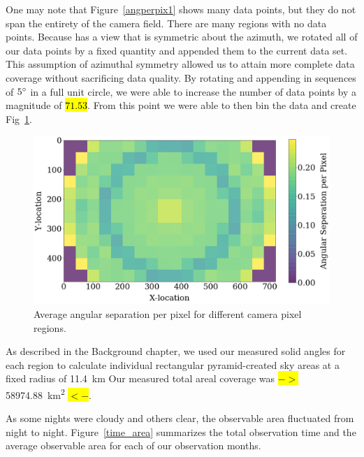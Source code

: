 One may note that Figure~\ref{angperpix1} shows many data points, but they do not span the entirety of the camera field. 
There are many regions with no data points.
Because has a view that is symmetric about the azimuth, we rotated all of our data points by a fixed quantity and appended them to the current data set.  
This assumption of azimuthal symmetry allowed us to attain more complete data coverage without sacrificing data quality.
By rotating and appending in sequences of $5\degree$ in a full unit circle, we were able to increase the number of data points by a magnitude of \hl{$71.53$}.
From this point we were able to then bin the data and create Fig~\ref{colorful}.


\begin{figure}[ht!]
  \centering
  \includegraphics[scale=0.35]{images/boxes_colored.png}
  \caption{Average angular separation per pixel for different camera pixel regions.}
  \label{colorful}
\end{figure}

As described in the Background chapter, we used our measured solid angles for each region to calculate individual rectangular pyramid-created sky areas at a fixed radius of \SI{11.4}{\kilo\meter}
Our measured total areal coverage was \hl{$->$} \SI{58974.88}{\square\kilo\meter} \hl{$<-$}.

As some nights were cloudy and others clear, the observable area fluctuated from night to night. 
Figure~\ref{time_area} summarizes the total observation time and the average observable area for each of our observation months. 


